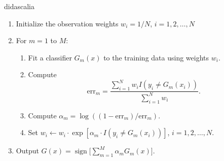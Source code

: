 \documentclass{report}
\DeclareMathOperator{\sgn}{sign}
\begin{document}
\begin{algorithm}[H]
\caption{didascalia}
\begin{enumerate}
	\item Initialize the observation weights \( w_i = 1/N \), \( i = 1, 2, \dots, N \)

	\item For \( m = 1 \) to \( M \):

	\begin{enumerate}
		\item Fit a classifier \( G_{m} (x) \) to the training data using weights \( w_i \).

		\item Compute
		\[
			\text{err}_m = \frac{\sum_{i=1}^N w_i I(y_i \neq G_m(x_i))}{\sum_{i=1}^{N} w_{i}}.
		\]

		\item Compute \( \alpha_m = \log((1 - \text{err}_m) / \text{err}_m) \).

		\item Set \( w_i \leftarrow w_i \cdot \exp [\alpha_m \cdot I(y_i \neq G_m(x_i))] \), \(i = 1, 2, \dots, N \).
	\end{enumerate}

	\item Output \( G(x) = \sgn \bigl[ \sum_{m = 1}^M \alpha_m G_m(x) \bigr] \).
	\end{enumerate}
\end{algorithm}
\end{document}
